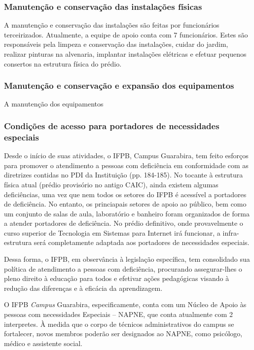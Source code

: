 \subsubsection{Manutenção e conservação das instalações físicas}

A manutenção e conservação das instalações são feitas por funcionários terceirizados. Atualmente, a equipe de apoio conta com 7 funcionários. Estes são responsáveis pela limpeza e conservação das instalações, cuidar do jardim, realizar pinturas na alvenaria, implantar instalações elétricas e efetuar pequenos consertos na estrutura física do prédio.

\subsubsection{Manutenção e conservação e expansão dos equipamentos}

A manutenção dos equipamentos 

\subsubsection{Condições de acesso para portadores de necessidades especiais}

	Desde o início de suas atividades, o IFPB, Campus Guarabira, tem feito esforços para promover o atendimento a pessoas com deficiência em conformidade com as diretrizes contidas no PDI da Instituição (pp. 184-185). No tocante à estrutura física atual (pr\'edio provis\'orio no antigo CAIC), ainda existem algumas defici\^encias, uma vez que nem todos os setores do IFPB \'e acess\'ivel a portadores de defici\^encia. No entanto, os princiapais setores de apoio ao p\'ublico, bem como um conjunto de salas de aula, laborat\'orio e banheiro foram organizados de forma a atender portadores de defici\^encia. No pr\'edio definitivo, onde provavelmente o curso superior de Tecnologia em Sistemas para Internet ir\'a funcionar, a infra-estrutura ser\'a completamente adaptada aos portadores de necessidades especiais.

	Dessa forma, o IFPB, em observância à legislação específica, tem consolidado sua política de atendimento a pessoas com deficiência, procurando assegurar-lhes o pleno direito à educação para todos e efetivar ações pedagógicas visando à redução das diferenças e à eficácia da aprendizagem.
 
	O IFPB \textit{Campus} Guarabira, especificamente, conta com um Núcleo de Apoio às pessoas com necessidades Especiais – NAPNE, que conta atualmente com 2 interpretes. \`A medida que o corpo de t\'ecnicos administrativos do campus se fortalecer, novos membros poder\~ao ser designados ao NAPNE, como psic\'ologo, m\'edico e assistente social.

